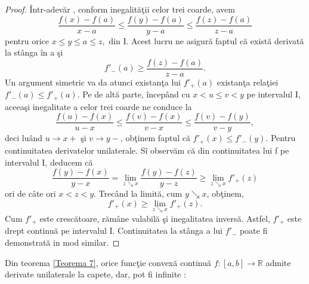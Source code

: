 \documentclass[a4paper,12pt,oneside]{report}
\begin{document}
\begin{proof}
\^{I}ntr-adev\u{a}r , conform inegalit\u{a}\c{t}ii celor trei coarde, avem
\begin{displaymath}
   \frac{f\left ( x \right ) - f\left ( a \right )}{x-a} \leq \frac{f\left ( y \right ) - f\left ( a \right )}{y-a}\leq \frac{f\left ( z \right ) - f\left ( a \right )}{z -a }
\end{displaymath}
pentru orice \(x\leq y\leq a\leq z,\) din I. Acest lucru ne asigur\u{a} faptul c\u{a} exist\u{a} derivat\u{a} la st\^{a}nga \^{i}n a \c{s}i 
\begin{displaymath}
   {f}'_{-}\left ( a \right )\geq \frac{f\left ( z \right ) - f\left ( a \right )}{z-a}.
\end{displaymath}
Un argument simetric va da atunci existan\c{t}a lui \({f}'_{+}\left ( a \right )\) existan\c{t}a rela\c{t}iei \({f}'_{-}\left ( a \right ) \leq  {f}'_{+}\left ( a \right )\). Pe de alt\u{a} parte, \^{i}ncep\^{a}nd cu \(x < u\leq v < y\) pe intervalul I, aceea\c{s}i inegalitate a celor trei coarde ne conduce la
\begin{displaymath}
   \frac{f\left ( u \right ) - f\left ( x \right )}{u-x}\leq \frac{f\left ( v \right ) - f\left ( x \right )}{v - x}\leq \frac{f\left ( v \right ) - f\left ( y  \right )}{v - y},
\end{displaymath}
deci lu\^{a}nd \(u\rightarrow x+\) \c{s}i \(v\rightarrow y- \), ob\c{t}inem faptul c\u{a} \({f}'_{+}\left ( x \right )\leq {f}'_{-}\left ( y \right ).\) 
Pentru continuitatea derivatelor unilaterale. S\^{i} observ\u{a}m c\u{a} din continuitatea lui f pe intervalul I, deducem c\u{a} 
\begin{displaymath}
   \frac{f\left ( y \right ) - f\left ( x \right )}{y-x} = \lim_{z \searrow x}\frac{f\left ( y \right ) - f\left ( z \right )}{y-z} \geq \lim_{z\searrow x}{f}'_{+}\left ( z \right )
\end{displaymath}
ori de c\^{a}te ori \(x < z < y\). Trec\^{a}nd la limit\u{a}, cum  \(y\searrow x \), ob\c{t}inem, 
\begin{displaymath}
 {f}'_{+}\left ( x \right ) \geq  \lim_{z \searrow x } {f}'_{+}\left ( z \right ). 
\end{displaymath}
Cum \({f}'_{+}\) este cresc\u{a}toare, r\u{a}m\^{a}ne valabil\u{a} \c{s}i inegalitatea invers\u{a}. Astfel, \({f}'_{+}\)  este drept continu\u{a} pe intervalul I. Continuitatea la st\^{a}nga a lui \({f}'_{-}\)  poate fi demonstrat\u{a} in mod similar. 
\end{proof}
Din teorema \ref{Teorema 7}, orice func\c{t}ie convex\u{a} continu\u{a} \(f:\left [ a,b \right ]\rightarrow \mathbb{R}\) admite derivate unilaterale la capete, dar, pot fi infinite :
\end{document}
